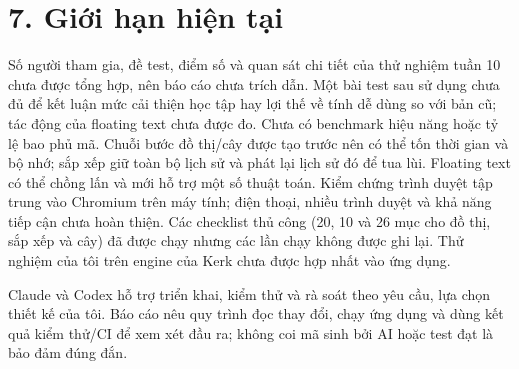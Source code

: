 \documentclass[11pt,a4paper]{article}
\begin{document}
\section*{7. Giới hạn hiện tại}
Số người tham gia, đề test, điểm số và quan sát chi tiết của thử nghiệm tuần 10 chưa được tổng hợp, nên báo cáo chưa trích dẫn. Một bài test sau sử dụng chưa đủ để kết luận mức cải thiện học tập hay lợi thế về tính dễ dùng so với bản cũ; tác động của floating text chưa được đo. Chưa có benchmark hiệu năng hoặc tỷ lệ bao phủ mã. Chuỗi bước đồ thị/cây được tạo trước nên có thể tốn thời gian và bộ nhớ; sắp xếp giữ toàn bộ lịch sử và phát lại lịch sử đó để tua lùi. Floating text có thể chồng lấn và mới hỗ trợ một số thuật toán. Kiểm chứng trình duyệt tập trung vào Chromium trên máy tính; điện thoại, nhiều trình duyệt và khả năng tiếp cận chưa hoàn thiện. Các checklist thủ công (20, 10 và 26 mục cho đồ thị, sắp xếp và cây) đã được chạy nhưng các lần chạy không được ghi lại. Thử nghiệm của tôi trên engine của Kerk chưa được hợp nhất vào ứng dụng.

Claude và Codex hỗ trợ triển khai, kiểm thử và rà soát theo yêu cầu, lựa chọn thiết kế của tôi. Báo cáo nêu quy trình đọc thay đổi, chạy ứng dụng và dùng kết quả kiểm thử/CI để xem xét đầu ra; không coi mã sinh bởi AI hoặc test đạt là bảo đảm đúng đắn.
\end{document}
